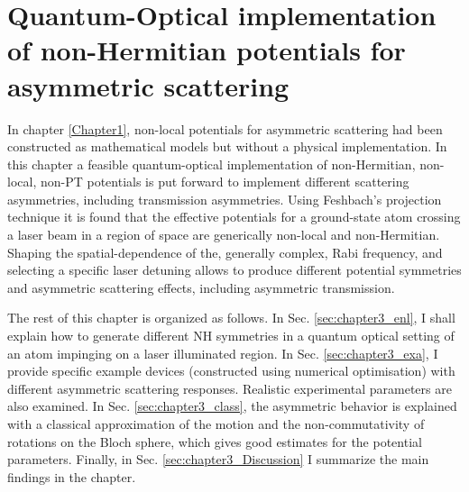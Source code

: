 
\chapter{Quantum-Optical implementation of non-Hermitian potentials for asymmetric scattering}
\label{Chapter3}

In chapter \ref{Chapter1}, non-local potentials for asymmetric scattering had been constructed as mathematical models but without a physical implementation. In this chapter a feasible quantum-optical implementation
of non-Hermitian, non-local, non-PT potentials is put forward to implement different scattering asymmetries, including transmission
asymmetries. Using Feshbach's projection technique it is found that the effective potentials for a ground-state atom crossing a laser beam in a region of space are generically non-local and non-Hermitian. Shaping the spatial-dependence of the, generally complex, Rabi frequency, and selecting a specific laser detuning allows to produce different potential symmetries and asymmetric scattering effects, including asymmetric transmission.

The rest of this chapter is organized as follows. In Sec. \ref{sec:chapter3_enl}, I shall explain how to generate different NH symmetries in a quantum optical setting of an atom impinging on a laser illuminated region. In Sec. \ref{sec:chapter3_exa}, I provide specific example devices (constructed using numerical optimisation) with different asymmetric scattering responses. Realistic experimental parameters are also examined. In Sec. \ref{sec:chapter3_class}, the asymmetric behavior is explained with a classical approximation of the motion and the non-commutativity of rotations on the Bloch sphere, which gives good estimates for the potential parameters. Finally, in Sec. \ref{sec:chapter3_Discussion} I summarize the main findings in the chapter.

